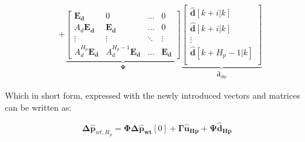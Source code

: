\begin{align}
\!\!&+\! 
\underbrace{\begin{bmatrix}
 \bm{E_d}& 0 & \hdots  & 0\\ 
 A_d\bm{E_d}&  \bm{E_d}& \hdots & 0\\ 
\vdots &\vdots  & \ddots  & \vdots\\ 
 A_d^{H_p}\bm{E_d}& A_d^{H_p-1}\bm{E_d}  & \hdots  & \bm{E_d}
\end{bmatrix}}_{\bm{\Psi}}
\underbrace{\begin{bmatrix}
 \bm{\hat{d}}[k+i|k] \\ 
 \bm{\hat{d}}[k+i|k]\\ 
\vdots \\ 
 \bm{\hat{d}}[k+H_p-1|k]\\ 
\end{bmatrix}}_{\bm{\hat{d}}_{Hp}} 
\end{align}

Which in short form, expressed with the newly introduced vectors and matrices can be written as: 

\begin{equation}
	\bm{\Delta \hat{p}}_{wt,H_p} = \bm{\Phi} \bm{\Delta \hat{p}}_{\bm{wt}}[0] + \bm{\Gamma} \bm{\hat{u}}_{\bm{Hp}} + \bm{\Psi} \bm{\hat{d}}_{\bm{Hp}}
	\label{extendedmatrix}
\end{equation}

